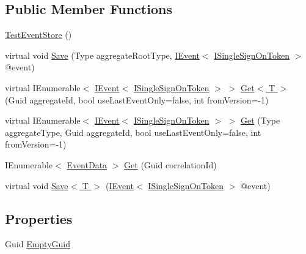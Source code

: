 \subsection*{Public Member Functions}
\begin{DoxyCompactItemize}
\item 
\hyperlink{classCqrs_1_1Tests_1_1Substitutes_1_1TestEventStore_a2687a0520b45af4fcf1e9083f42c194b_a2687a0520b45af4fcf1e9083f42c194b}{Test\+Event\+Store} ()
\item 
virtual void \hyperlink{classCqrs_1_1Tests_1_1Substitutes_1_1TestEventStore_ac5f756c50e6af8df69313cd24f1c69f5_ac5f756c50e6af8df69313cd24f1c69f5}{Save} (Type aggregate\+Root\+Type, \hyperlink{interfaceCqrs_1_1Events_1_1IEvent}{I\+Event}$<$ \hyperlink{interfaceCqrs_1_1Authentication_1_1ISingleSignOnToken}{I\+Single\+Sign\+On\+Token} $>$ @event)
\item 
virtual I\+Enumerable$<$ \hyperlink{interfaceCqrs_1_1Events_1_1IEvent}{I\+Event}$<$ \hyperlink{interfaceCqrs_1_1Authentication_1_1ISingleSignOnToken}{I\+Single\+Sign\+On\+Token} $>$ $>$ \hyperlink{classCqrs_1_1Tests_1_1Substitutes_1_1TestEventStore_a3cbf3e72012e13320cf4d9bb47e9face_a3cbf3e72012e13320cf4d9bb47e9face}{Get$<$ T $>$} (Guid aggregate\+Id, bool use\+Last\+Event\+Only=false, int from\+Version=-\/1)
\item 
virtual I\+Enumerable$<$ \hyperlink{interfaceCqrs_1_1Events_1_1IEvent}{I\+Event}$<$ \hyperlink{interfaceCqrs_1_1Authentication_1_1ISingleSignOnToken}{I\+Single\+Sign\+On\+Token} $>$ $>$ \hyperlink{classCqrs_1_1Tests_1_1Substitutes_1_1TestEventStore_a58e89fab7fdfafff88c62317b6765e55_a58e89fab7fdfafff88c62317b6765e55}{Get} (Type aggregate\+Type, Guid aggregate\+Id, bool use\+Last\+Event\+Only=false, int from\+Version=-\/1)
\item 
I\+Enumerable$<$ \hyperlink{classCqrs_1_1Events_1_1EventData}{Event\+Data} $>$ \hyperlink{classCqrs_1_1Tests_1_1Substitutes_1_1TestEventStore_afde308e712368690629564a1001928e6_afde308e712368690629564a1001928e6}{Get} (Guid correlation\+Id)
\item 
virtual void \hyperlink{classCqrs_1_1Tests_1_1Substitutes_1_1TestEventStore_ab727c96e0f9a36729c1e10fabbef969f_ab727c96e0f9a36729c1e10fabbef969f}{Save$<$ T $>$} (\hyperlink{interfaceCqrs_1_1Events_1_1IEvent}{I\+Event}$<$ \hyperlink{interfaceCqrs_1_1Authentication_1_1ISingleSignOnToken}{I\+Single\+Sign\+On\+Token} $>$ @event)
\end{DoxyCompactItemize}
\subsection*{Properties}
\begin{DoxyCompactItemize}
\item 
Guid \hyperlink{classCqrs_1_1Tests_1_1Substitutes_1_1TestEventStore_a04a613fcd8715c1d053efcb303c06565_a04a613fcd8715c1d053efcb303c06565}{Empty\+Guid}
\end{DoxyCompactItemize}



